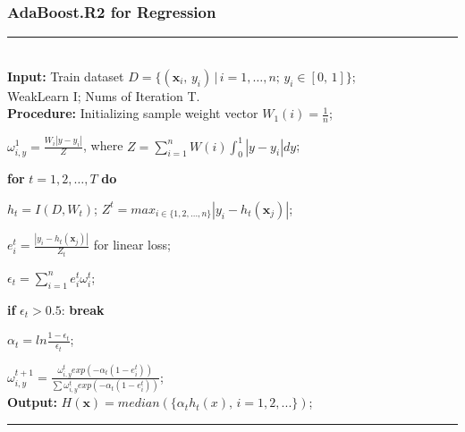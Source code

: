\documentclass[usenames,dvipsnames]{beamer}
\begin{document}
\begin{frame}
\frametitle{AdaBoost.R2 for Regression}
\noindent\rule[0.1\baselineskip]{\textwidth}{0.75pt}\\
      \textbf{Input:} Train dataset $D = \{(\textbf{x}_i,\,y_i)\,|\,i = 1,\dots, n;\, y_i \in [0,\,1]\}$;\\
      \hspace*{32pt} WeakLearn I; Nums of Iteration T.\\
      \textbf{Procedure:} 
          \hspace*{2pt} Initializing sample weight vector $W_1(i) = \frac{1}{n}$;\par
          \hspace*{36pt}$\omega_{i,y}^1 = \frac{W_i|y-y_i|}{Z}$, where $Z = \sum_{i=1}^{n}W(i)\int_{0}^{1}|y-y_i|dy$; \par
          \hspace*{32pt} \textbf{for} $t = 1, 2,\dots, T$ \textbf{do}\par
              \hspace*{48pt} $h_t = I(D, W_t)$; $Z^t = max_{i \in \{1,2,\dots,n\}}|y_i-h_t(\textbf{x}_j)|$;\par
              \hspace*{48pt} $e_i^t = \frac{|y_i-h_t(\textbf{x}_j)|}{Z_t}$ for linear loss;\par
              \hspace*{48pt} $\epsilon_t = \sum_{i=1}^{n}e_i^t\omega_i^t$;\par
              \hspace*{48pt} \textbf{if} $\epsilon_t > 0.5$: \textbf{break}\par
              \hspace*{48pt} $\alpha_t = ln\frac{1-\epsilon_t}{\epsilon_t}$;\par
              \hspace*{48pt} $\omega_{i,y}^{t+1} = \frac{\omega_{i,y}^{t}exp(-\alpha_t(1-e_i^t))}{\sum\omega_{i,y}^{t}exp(-\alpha_t(1-e_i^t))}$;\\
      \textbf{Output:} $H(\textbf{x}) = median(\{\alpha_th_t(x),\,i=1,2,...\})$;\par
      \noindent\rule[0.1\baselineskip]{\textwidth}{0.75pt}
\end{frame}
\end{document}
